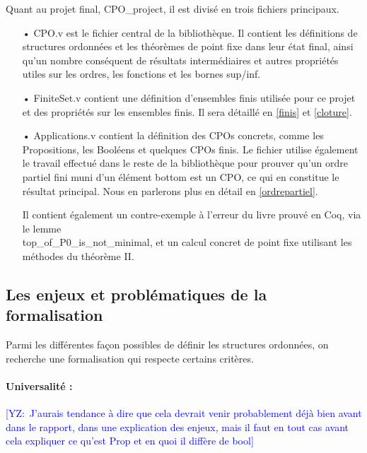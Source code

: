 \documentclass{article}
\newcommand{\yz}[1]{\textcolor{blue}{{[YZ:~#1]}}}
\newcommand\code[1]{{\fontfamily{lmtt}\selectfont #1}}
\theoremstyle{definition}
\begin{document}
\medskip

Quant au projet final, \code{CPO\_project}, il est divisé en trois fichiers principaux.

\medskip


\begin{itemize}
\item[•] \code{CPO.v} est le fichier central de la bibliothèque. Il contient les définitions de structures ordonnées et les théorèmes de point fixe dans leur état final, ainsi qu'un nombre conséquent de résultats intermédiaires et autres propriétés utiles sur les ordres, les fonctions et les bornes sup/inf.
\item[•] \code{FiniteSet.v} contient une définition d'ensembles finis utilisée pour ce projet et des propriétés sur les ensembles finis. Il sera détaillé en \ref{finis} et \ref{cloture}.
\item[•] \code{Applications.v} contient la définition des CPOs concrets, comme les Propositions, les Booléens et quelques CPOs finis. Le fichier utilise également le travail effectué dans le reste de la bibliothèque pour prouver qu'un ordre partiel fini muni d'un élément bottom est un CPO, ce qui en constitue le résultat principal. Nous en parlerons plus en détail en \ref{ordrepartiel}.

Il contient également un contre-exemple à l'erreur du livre prouvé en Coq, via le lemme \\ \code{top\_of\_P0\_is\_not\_minimal}, et un calcul concret de point fixe utilisant les méthodes du théorème II.
\end{itemize}




\subsection{Les enjeux et problématiques de la formalisation}

Parmi les différentes façon possibles de définir les structures ordonnées, on recherche une formalisation qui respecte certains critères.

\paragraph{Universalité :\\}
\label{universalite}
\yz{J'aurais tendance à dire que cela devrait venir probablement déjà bien avant
dans le rapport, dans une explication des enjeux, mais il faut en tout cas avant
cela expliquer ce qu'est Prop et en quoi il diffère de bool}
\end{document}
